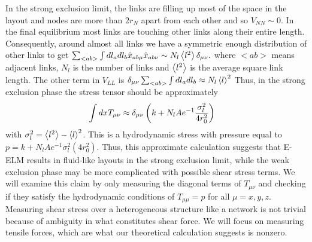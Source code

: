 \documentclass[nofootinbib,preprint,floatfix,endfloats]{revtex4} %
\begin{document}
In the strong exclusion limit, the links are filling up most of the space in the layout and nodes are more than $2r_N$ apart from each other and so $V_{NN} \sim 0$. 
In the final equilibrium most links are touching other links along their entire length. 
Consequently, around almost all links we have a symmetric enough distribution of other links to get 
    $\sum_{<ab>}\int dl_a dl_b \hat{x}_{ab \mu} \hat{x}_{ab\nu} \sim  N_l\left<l^2\right> \delta_{\mu\nu}.$ 
where $<ab>$ means adjacent links, $N_l$ is the number of links and $\left<l^2\right>$ is the average square link length. 
The other term in $V_{LL}$ is
$\delta_{\mu\nu}\sum_{<ab>}\int dl_a dl_b \approx N_l \left<l\right>^2 $
Thus, in the strong exclusion phase the stress tensor should be approximately
\begin{align}
    \int dx T_{\mu\nu} & \approx \delta_{\mu\nu} \left(k + N_l Ae^{-1} {\sigma_l^2\over 4r_0^2} \right)
    \label{eq:Tstrong}
\end{align}
with $\sigma_l^2 = \left<l^2\right> - \left<l\right>^2$. 
This is a hydrodynamic stress with pressure equal to $ p = k + N_l Ae^{-1} \sigma_l^2 (4r_0^2)$. 
Thus, this approximate calculation suggests that E-ELM results in fluid-like layouts in the strong exclusion limit, while the weak exclusion phase may be more complicated with possible shear stress terms. 
We will examine this claim by only measuring the diagonal terms of $T_{\mu\nu}$ and checking if they satisfy the hydrodynamic conditions of $T_{\mu\mu}=p$ for all $\mu=x,y,z$. 
Measuring shear stress over a heterogeneous structure like a network is not trivial because of ambiguity in what constitutes shear force. 
We will focus on measuring tensile forces, which are what our theoretical calculation suggests is nonzero.  


\end{document}
